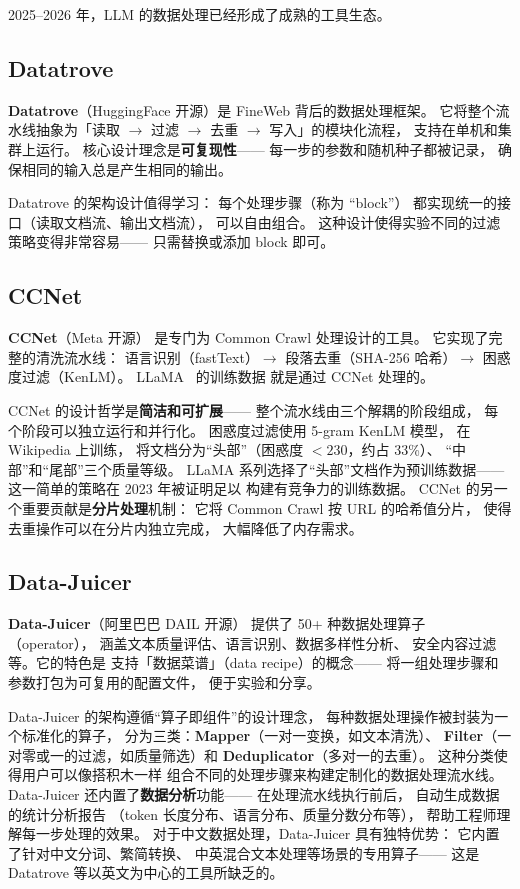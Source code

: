 2025--2026 年，LLM 的数据处理已经形成了成熟的工具生态。

\subsection{Datatrove}

\textbf{Datatrove}（HuggingFace 开源）是 FineWeb 背后的数据处理框架。
它将整个流水线抽象为「读取 $\to$ 过滤 $\to$ 去重 $\to$ 写入」的模块化流程，
支持在单机和集群上运行。
核心设计理念是\textbf{可复现性}——
每一步的参数和随机种子都被记录，
确保相同的输入总是产生相同的输出。

Datatrove 的架构设计值得学习：
每个处理步骤（称为 ``block''）
都实现统一的接口（读取文档流、输出文档流），
可以自由组合。
这种设计使得实验不同的过滤策略变得非常容易——
只需替换或添加 block 即可。

\subsection{CCNet}

\textbf{CCNet}（Meta 开源）
是专门为 Common Crawl 处理设计的工具。
它实现了完整的清洗流水线：
语言识别（fastText）$\to$
段落去重（SHA-256 哈希）$\to$
困惑度过滤（KenLM）。
LLaMA~\cite{touvron2023llama} 的训练数据
就是通过 CCNet 处理的。

CCNet 的设计哲学是\textbf{简洁和可扩展}——
整个流水线由三个解耦的阶段组成，
每个阶段可以独立运行和并行化。
困惑度过滤使用 5-gram KenLM 模型，
在 Wikipedia 上训练，
将文档分为``头部''（困惑度 $< 230$，约占 33\%）、
``中部''和``尾部''三个质量等级。
LLaMA 系列选择了``头部''文档作为预训练数据——
这一简单的策略在 2023 年被证明足以
构建有竞争力的训练数据。
CCNet 的另一个重要贡献是\textbf{分片处理}机制：
它将 Common Crawl 按 URL 的哈希值分片，
使得去重操作可以在分片内独立完成，
大幅降低了内存需求。

\subsection{Data-Juicer}

\textbf{Data-Juicer}（阿里巴巴 DAIL 开源）
提供了 50+ 种数据处理算子（operator），
涵盖文本质量评估、语言识别、数据多样性分析、
安全内容过滤等。它的特色是
支持「数据菜谱」（data recipe）的概念——
将一组处理步骤和参数打包为可复用的配置文件，
便于实验和分享。

Data-Juicer 的架构遵循``算子即组件''的设计理念，
每种数据处理操作被封装为一个标准化的算子，
分为三类：\textbf{Mapper}（一对一变换，如文本清洗）、
\textbf{Filter}（一对零或一的过滤，如质量筛选）和
\textbf{Deduplicator}（多对一的去重）。
这种分类使得用户可以像搭积木一样
组合不同的处理步骤来构建定制化的数据处理流水线。
Data-Juicer 还内置了\textbf{数据分析}功能——
在处理流水线执行前后，
自动生成数据的统计分析报告
（token 长度分布、语言分布、质量分数分布等），
帮助工程师理解每一步处理的效果。
对于中文数据处理，Data-Juicer 具有独特优势：
它内置了针对中文分词、繁简转换、
中英混合文本处理等场景的专用算子——
这是 Datatrove 等以英文为中心的工具所缺乏的。

